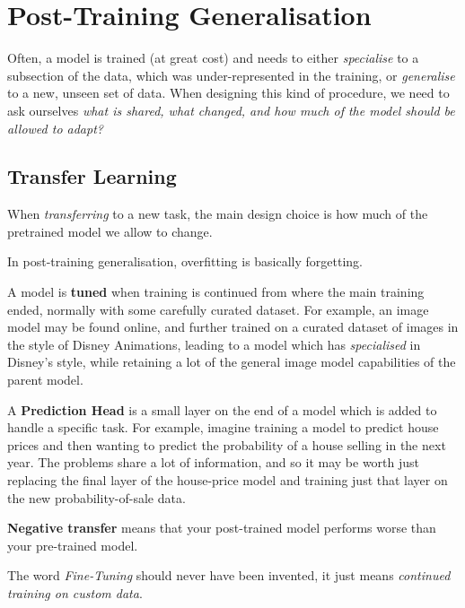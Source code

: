 \chapter{Post-Training Generalisation}
\label{chap:Downstream Post-Training Generalisation}
Often, a model is trained (at great cost) and needs to either \textit{specialise} to a subsection of the data, which was under-represented in the training, or \textit{generalise} to a new, unseen set of data.
When designing this kind of procedure, we need to ask ourselves \textit{what is shared, what changed, and how much of the model should be allowed to adapt?}


\section{Transfer Learning}
\label{sec:adaptation-transfer-learning-reuse-what-the-model-has-learned}

When \textit{transferring} to a new task, the main design choice is how much of the pretrained model we allow to change.

\begin{calloutmemoryhook}
    In post-training generalisation, overfitting is basically forgetting.
\end{calloutmemoryhook}

A model is \textbf{tuned} when training is continued from where the main training ended, normally with some carefully curated dataset.
For example, an image model may be found online, and further trained on a curated dataset of images in the style of Disney Animations, leading to a model which has \textit{specialised} in Disney's style, while retaining a lot of the general image model capabilities of the parent model.

A \textbf{Prediction Head} is a small layer on the end of a model which is added to handle a specific task. 
For example, imagine training a model to predict house prices and then wanting to predict the probability of a house selling in the next year. 
The problems share a lot of information, and so it may be worth just replacing the final layer of the house-price model and training just that layer on the new probability-of-sale data.

\textbf{Negative transfer} means that your post-trained model performs worse than your pre-trained model.

\begin{calloutmemoryhook}
    The word \textit{Fine-Tuning} should never have been invented, it just means \textit{continued training on custom data}.
\end{calloutmemoryhook}

